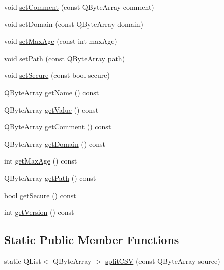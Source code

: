 \begin{DoxyCompactItemize}
void \hyperlink{class_c_w_f_1_1_http_cookie_afdc325664f2944eab395e2448d8bd44c}{set\+Comment} (const Q\+Byte\+Array comment)
\item 
void \hyperlink{class_c_w_f_1_1_http_cookie_ad8763ad422d5aa57657ddd0e339a896d}{set\+Domain} (const Q\+Byte\+Array domain)
\item 
void \hyperlink{class_c_w_f_1_1_http_cookie_ab740d39df2e55d21997a986c07eed72a}{set\+Max\+Age} (const int max\+Age)
\item 
void \hyperlink{class_c_w_f_1_1_http_cookie_a47befb40801cf96bd399183674f8e6db}{set\+Path} (const Q\+Byte\+Array path)
\item 
void \hyperlink{class_c_w_f_1_1_http_cookie_a47aee228dacdccddaf8dd10980bd38fb}{set\+Secure} (const bool secure)
\item 
Q\+Byte\+Array \hyperlink{class_c_w_f_1_1_http_cookie_a7e0e3d818e1abb1a87c27ad64d3ef1bd}{get\+Name} () const 
\item 
Q\+Byte\+Array \hyperlink{class_c_w_f_1_1_http_cookie_a6dfaa65b0fdc459987adffbb9957eb89}{get\+Value} () const 
\item 
Q\+Byte\+Array \hyperlink{class_c_w_f_1_1_http_cookie_a6cb9c628c0c9eb714945dc9227a85c03}{get\+Comment} () const 
\item 
Q\+Byte\+Array \hyperlink{class_c_w_f_1_1_http_cookie_ad50d4e09e1f63daa18887e1d5349dc1e}{get\+Domain} () const 
\item 
int \hyperlink{class_c_w_f_1_1_http_cookie_ad1e15510ff41114f5d96d17e697b3911}{get\+Max\+Age} () const 
\item 
Q\+Byte\+Array \hyperlink{class_c_w_f_1_1_http_cookie_ad34b0b8cfd90ecc2bc612c6d13227ddc}{get\+Path} () const 
\item 
bool \hyperlink{class_c_w_f_1_1_http_cookie_a1d0917c49dcd958df946c680a8a555a2}{get\+Secure} () const 
\item 
int \hyperlink{class_c_w_f_1_1_http_cookie_a7b44ee026837508edd121caf5dfd205b}{get\+Version} () const 
\end{DoxyCompactItemize}
\subsection*{Static Public Member Functions}
\begin{DoxyCompactItemize}
\item 
static Q\+List$<$ Q\+Byte\+Array $>$ \hyperlink{class_c_w_f_1_1_http_cookie_a4806d182d52218366eba504d505ec59f}{split\+C\+S\+V} (const Q\+Byte\+Array source)
\end{DoxyCompactItemize}


